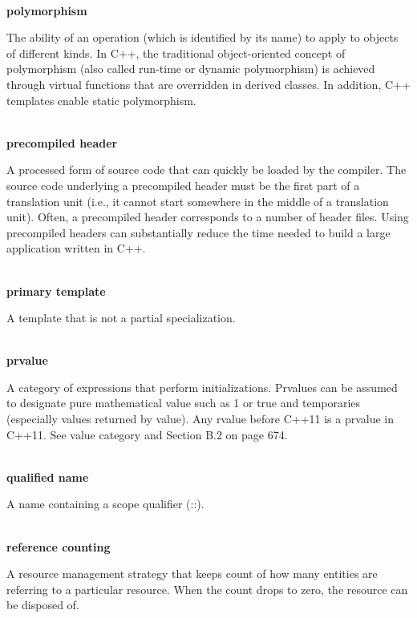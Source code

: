 \hspace*{\fill} \\ %
\noindent
\textbf{polymorphism}

The ability of an operation (which is identified by its name) to apply to objects of different kinds. In C++, the traditional object-oriented concept of polymorphism (also called run-time or dynamic polymorphism) is achieved through virtual functions that are overridden in derived classes. In addition, C++ templates enable static polymorphism.

\hspace*{\fill} \\ %
\noindent
\textbf{precompiled header}

A processed form of source code that can quickly be loaded by the compiler. The source code underlying a precompiled header must be the first part of a translation unit (i.e., it cannot start somewhere in the middle of a translation unit). Often, a precompiled header corresponds to a number of header files. Using precompiled headers can substantially reduce the time needed to build a large application written in C++.

\hspace*{\fill} \\ %
\noindent
\textbf{primary template}

A template that is not a partial specialization.

\hspace*{\fill} \\ %
\noindent
\textbf{prvalue}

A category of expressions that perform initializations. Prvalues can be assumed to designate pure mathematical value such as 1 or true and temporaries (especially values returned by value). Any rvalue before C++11 is a prvalue in C++11. See value category and Section B.2 on page 674.

\hspace*{\fill} \\ %
\noindent
\textbf{qualified name}

A name containing a scope qualifier (::).

\hspace*{\fill} \\ %
\noindent
\textbf{reference counting}

A resource management strategy that keeps count of how many entities are referring to a particular resource. When the count drops to zero, the resource can be disposed of.

